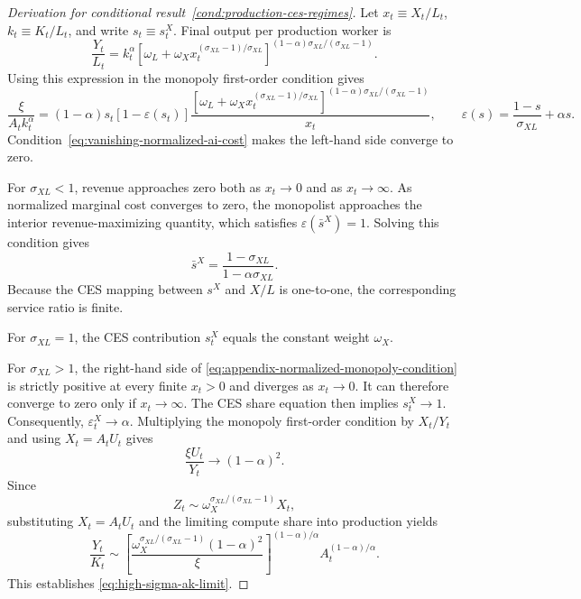 \begin{proof}[Derivation for conditional result~\ref{cond:production-ces-regimes}]
Let $x_t\equiv X_t/L_t$, $k_t\equiv K_t/L_t$, and write
$s_t\equiv s^X_t$. Final output per production worker is
\[
    \frac{Y_t}{L_t}
    =
    k_t^\alpha
    \left[
        \omega_L
        +\omega_Xx_t^{(\sigma_{XL}-1)/\sigma_{XL}}
    \right]^{(1-\alpha)\sigma_{XL}/(\sigma_{XL}-1)}.
\]
Using this expression in the monopoly first-order condition gives
\begin{equation}
    \frac{\xi}{A_tk_t^\alpha}
    =
    (1-\alpha)s_t[1-\varepsilon(s_t)]
    \frac{
        \left[
            \omega_L
            +\omega_Xx_t^{(\sigma_{XL}-1)/\sigma_{XL}}
        \right]^{(1-\alpha)\sigma_{XL}/(\sigma_{XL}-1)}
    }{x_t},
    \qquad
    \varepsilon(s)
    =
    \frac{1-s}{\sigma_{XL}}+\alpha s.
    \label{eq:appendix-normalized-monopoly-condition}
\end{equation}
Condition~\eqref{eq:vanishing-normalized-ai-cost} makes the left-hand side
converge to zero.

For $\sigma_{XL}<1$, revenue approaches zero both as $x_t\to0$ and as
$x_t\to\infty$. As normalized marginal cost converges to zero, the monopolist
approaches the interior revenue-maximizing quantity, which satisfies
$\varepsilon(\bar s^X)=1$.
Solving this condition gives
\[
    \bar s^X=\frac{1-\sigma_{XL}}{1-\alpha\sigma_{XL}}.
\]
Because the CES mapping between $s^X$ and $X/L$ is one-to-one, the corresponding
service ratio is finite.

For $\sigma_{XL}=1$, the CES contribution $s^X_t$ equals the constant weight $\omega_X$.

For $\sigma_{XL}>1$, the right-hand side of
\eqref{eq:appendix-normalized-monopoly-condition} is strictly positive at every
finite $x_t>0$ and diverges as $x_t\to0$. It can therefore converge to zero only if
$x_t\to\infty$. The CES share equation then implies $s^X_t\to1$. Consequently,
$\varepsilon^X_t\to\alpha$. Multiplying the monopoly first-order condition by
$X_t/Y_t$ and using $X_t=A_tU_t$ gives
\[
    \frac{\xi U_t}{Y_t}\longrightarrow(1-\alpha)^2.
\]
Since
\[
    Z_t\sim
    \omega_X^{\sigma_{XL}/(\sigma_{XL}-1)}X_t,
\]
substituting $X_t=A_tU_t$ and the limiting compute share into production yields
\[
    \frac{Y_t}{K_t}
    \sim
    \left[
        \frac{\omega_X^{\sigma_{XL}/(\sigma_{XL}-1)}(1-\alpha)^2}{\xi}
    \right]^{(1-\alpha)/\alpha}
    A_t^{(1-\alpha)/\alpha}.
\]
This establishes \eqref{eq:high-sigma-ak-limit}.
\end{proof}

